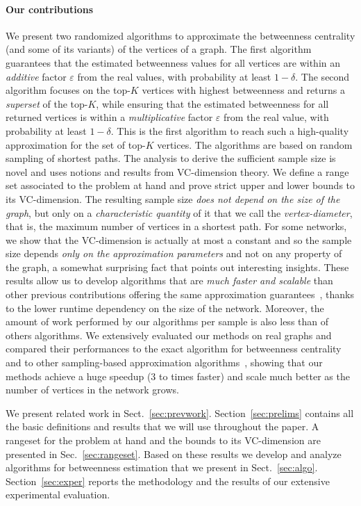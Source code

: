 \paragraph{Our contributions} 
We present two randomized algorithms to approximate the betweenness centrality
(and some of its variants) of the vertices of a graph. The first algorithm
guarantees that the estimated betweenness values for all vertices are within an
\emph{additive} factor $\varepsilon$ from the real values, with probability at
least $1-\delta$. The second algorithm focuses on the top-$K$ vertices with
highest betweenness and returns a \emph{superset} of the top-$K$,
while ensuring that the estimated betweenness for all returned vertices is
within a \emph{multiplicative} factor $\varepsilon$ from the real value, with
probability at least $1-\delta$. This is the first algorithm to reach such a
high-quality approximation for the set of top-$K$ vertices. The algorithms are
based on random sampling of shortest paths. The analysis to derive the
sufficient sample size is novel and uses notions and results from VC-dimension
theory. We define a range set associated to the problem at hand and prove strict
upper and lower bounds to its VC-dimension. The resulting sample size \emph{does not
depend on the size of the graph}, but only on a \emph{characteristic quantity} of it
that we call the \emph{vertex-diameter}, that is, the maximum number of vertices
in a shortest path. For some networks, we show that the VC-dimension is actually
at most a constant and so the sample size depends \emph{only on the approximation
parameters} and not on any property of the graph, a somewhat surprising fact
that points out interesting insights. These results allow us to develop
algorithms that are \emph{much faster and scalable} than other previous
contributions offering the same approximation
guarantees~\citep{JacobKLPT05,BrandesP07,GeisbergerSS08}, thanks to the lower
runtime dependency on the size of the network. Moreover, the amount of work
performed by our algorithms per sample is also less than of others algorithms.
We extensively evaluated our methods on real graphs and compared their
performances to the exact algorithm for betweenness centrality~\citep{Brandes01}
and to other sampling-based approximation
algorithms~\citep{JacobKLPT05,BrandesP07,GeisbergerSS08}, showing that our
methods achieve a huge speedup (3 to \XXX times faster) and scale much better as
the number of vertices in the network grows.

We present related work in Sect.~\ref{sec:prevwork}. Section~\ref{sec:prelims}
contains all the basic definitions and results that we will use throughout the
paper. A rangeset for the problem at hand and the bounds to its VC-dimension
are presented in Sec.~\ref{sec:rangeset}. Based on these results we develop and
analyze algorithms for betweenness estimation that we present in
Sect.~\ref{sec:algo}. Section~\ref{sec:exper} reports the methodology and
the results of our extensive experimental evaluation.

